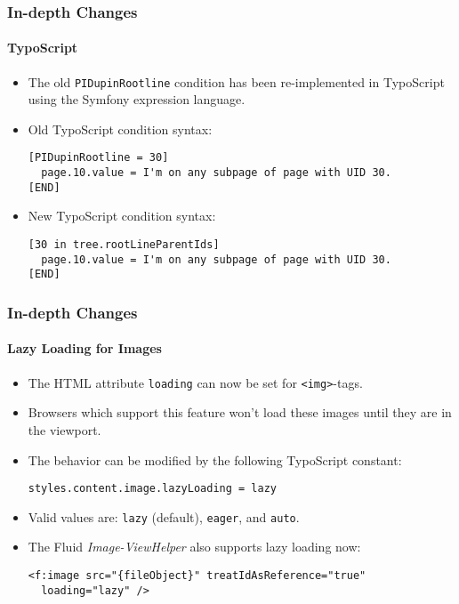 \begin{frame}[fragile]
	\frametitle{In-depth Changes}
	\framesubtitle{TypoScript}

	\lstset{basicstyle=\smaller\ttfamily}

	\begin{itemize}
		\item The old \texttt{PIDupinRootline} condition has been re-implemented
			in TypoScript using the Symfony expression language.
		\item Old TypoScript condition syntax:
\begin{lstlisting}
[PIDupinRootline = 30]
  page.10.value = I'm on any subpage of page with UID 30.
[END]
\end{lstlisting}

		\item New TypoScript condition syntax:
\begin{lstlisting}
[30 in tree.rootLineParentIds]
  page.10.value = I'm on any subpage of page with UID 30.
[END]
\end{lstlisting}

	\end{itemize}

\end{frame}


\begin{frame}[fragile]
	\frametitle{In-depth Changes}
	\framesubtitle{Lazy Loading for Images}

	\lstset{basicstyle=\smaller\ttfamily}

	\begin{itemize}
		\item The HTML attribute \texttt{loading} can now be set for \texttt{<img>}-tags.
		\item Browsers which support this feature won't load these images until they are in the viewport.
		\item The behavior can be modified by the following TypoScript constant:
\begin{lstlisting}
styles.content.image.lazyLoading = lazy
\end{lstlisting}

		\item Valid values are: \texttt{lazy} (default), \texttt{eager}, and \texttt{auto}.
		\item The Fluid \textit{Image-ViewHelper} also supports lazy loading now:
\begin{lstlisting}
<f:image src="{fileObject}" treatIdAsReference="true"
  loading="lazy" />
\end{lstlisting}

	\end{itemize}

\end{frame}

